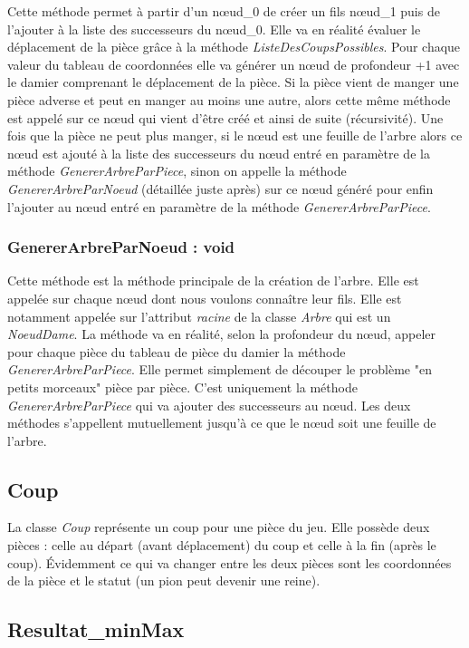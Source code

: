 \documentclass[12,french]{report}
\begin{document}
Cette méthode permet à partir d'un nœud\_0 de créer un fils nœud\_1 puis de l'ajouter à la liste des successeurs du nœud\_0. Elle va en réalité évaluer le déplacement de la pièce grâce à la méthode \textit{ListeDesCoupsPossibles}. Pour chaque valeur du tableau de coordonnées elle va générer un nœud de profondeur +1 avec le damier comprenant le déplacement de la pièce. Si la pièce vient de manger une pièce adverse et peut en manger au moins une autre, alors cette même méthode est appelé sur ce nœud qui vient d'être créé et ainsi de suite (récursivité). Une fois que la pièce ne peut plus manger, si le nœud est une feuille de l'arbre alors ce nœud est ajouté à la liste des successeurs du nœud entré en paramètre de la méthode \textit{GenererArbreParPiece}, sinon on appelle la méthode \textit{GenererArbreParNoeud} (détaillée juste après) sur ce nœud généré pour enfin l'ajouter au nœud entré en paramètre de la méthode \textit{GenererArbreParPiece}. 

\subsubsection{GenererArbreParNoeud : void}

Cette méthode est la méthode principale de la création de l'arbre. Elle est appelée sur chaque nœud dont nous voulons connaître leur fils. Elle est notamment appelée sur l'attribut \textit{racine} de la classe \textit{Arbre} qui est un \textit{NoeudDame}. La méthode va en réalité, selon la profondeur du nœud, appeler pour chaque pièce du tableau de pièce du damier la méthode \textit{GenererArbreParPiece}. Elle permet simplement de découper le problème "en petits morceaux" pièce par pièce. C'est uniquement la méthode \textit{GenererArbreParPiece} qui va ajouter des successeurs au nœud. Les deux méthodes s'appellent mutuellement jusqu'à ce que le nœud soit une feuille de l'arbre.

\subsection{Coup}

La classe \textit{Coup} représente un coup pour une pièce du jeu. Elle possède deux pièces : celle au départ (avant déplacement) du coup et celle à la fin (après le coup). Évidemment ce qui va changer entre les deux pièces sont les coordonnées de la pièce et le statut (un pion peut devenir une reine).

\subsection{Resultat\_minMax}
\end{document}
